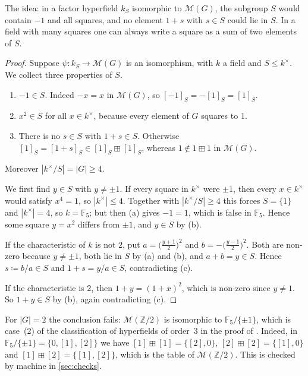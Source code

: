 \documentclass[11pt]{amsart}
\numberwithin{equation}{section}
\newcommand{\hplus}{\boxplus}
\newcommand{\Mas}{\mathcal M}
\newcommand{\Z}{\mathbb Z}
\newcommand{\F}{\mathbb F}
\newcommand{\cls}[1]{[#1]}
\begin{document}
The idea: in a factor hyperfield $k_S$ isomorphic to $\Mas(G)$, the subgroup $S$ would contain $-1$ and all squares, and no element $1+s$ with $s\in S$ could lie in $S$. In a field with many squares one can always write a square as a sum of two elements of $S$.

\begin{proof}
Suppose $\psi\colon k_S\to\Mas(G)$ is an isomorphism, with $k$ a field and $S\le k^\times$. We collect three properties of $S$.
\begin{enumerate}
\item[(a)] $-1\in S$. Indeed $-x=x$ in $\Mas(G)$, so $\cls{-1}_S=-\cls1_S=\cls1_S$.
\item[(b)] $x^2\in S$ for all $x\in k^\times$, because every element of $G$ squares to $1$.
\item[(c)] There is no $s\in S$ with $1+s\in S$. Otherwise $\cls1_S=\cls{1+s}_S\in\cls1_S\hplus\cls1_S$, whereas $1\notin1\hplus1$ in $\Mas(G)$.
\end{enumerate}
Moreover $|k^\times/S|=|G|\ge4$.

We first find $y\in S$ with $y\ne\pm1$. If every square in $k^\times$ were $\pm1$, then every $x\in k^\times$ would satisfy $x^4=1$, so $|k^\times|\le4$. Together with $|k^\times/S|\ge4$ this forces $S=\{1\}$ and $|k^\times|=4$, so $k=\F_5$; but then (a) gives $-1=1$, which is false in $\F_5$. Hence some square $y=x^2$ differs from $\pm1$, and $y\in S$ by (b).

If the characteristic of $k$ is not $2$, put $a=\bigl(\tfrac{y+1}{2}\bigr)^2$ and $b=-\bigl(\tfrac{y-1}{2}\bigr)^2$. Both are non-zero because $y\ne\pm1$, both lie in $S$ by (a) and (b), and $a+b=y\in S$. Hence $s\coloneqq b/a\in S$ and $1+s=y/a\in S$, contradicting (c).

If the characteristic is $2$, then $1+y=(1+x)^2$, which is non-zero since $y\ne1$. So $1+y\in S$ by (b), again contradicting (c).
\end{proof}

\begin{remark}\label{rem:three}
For $|G|=2$ the conclusion fails: $\Mas(\Z/2)$ is isomorphic to $\F_5/\{\pm1\}$, which is case~(2) of the classification of hyperfields of order~$3$ in the proof of \cite[Theorem~1.3(2)]{BakerJin21}. Indeed, in $\F_5/\{\pm1\}=\{0,\cls1,\cls2\}$ we have $\cls1\hplus\cls1=\{\cls2,0\}$, $\cls2\hplus\cls2=\{\cls1,0\}$ and $\cls1\hplus\cls2=\{\cls1,\cls2\}$, which is the table of $\Mas(\Z/2)$. This is checked by machine in \cref{sec:checks}.
\end{remark}
\end{document}
